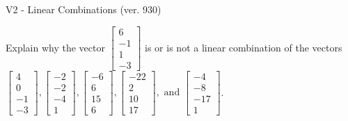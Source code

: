 \begin{exercise}
  \begin{exerciseTitle}V2 - Linear Combinations (ver. 930)\end{exerciseTitle}
  \begin{exerciseStatement}
    Explain why the vector \(\left[\begin{array}{c}
6 \\
-1 \\
1 \\
-3
\end{array}\right]\)  is or is not a linear 
	combination of the vectors \(\left[\begin{array}{c}
4 \\
0 \\
-1 \\
-3
\end{array}\right] , \left[\begin{array}{c}
-2 \\
-2 \\
-4 \\
1
\end{array}\right] , \left[\begin{array}{c}
-6 \\
6 \\
15 \\
6
\end{array}\right] , \left[\begin{array}{c}
-22 \\
2 \\
10 \\
17
\end{array}\right] , \text{ and } \left[\begin{array}{c}
-4 \\
-8 \\
-17 \\
1
\end{array}\right]\).
	



\end{exerciseStatement}
\end{exercise}
